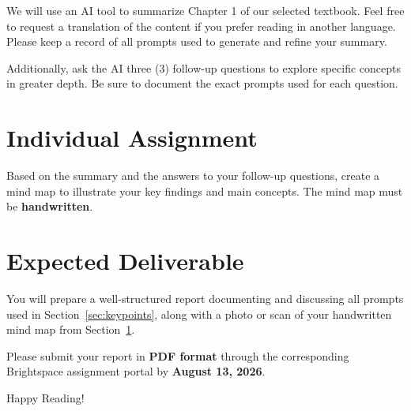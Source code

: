 \documentclass{article}
\begin{document}
We will use an AI tool to summarize Chapter 1 of our selected textbook. Feel free to request a translation of the content if you prefer reading in another language. Please keep a record of all prompts used to generate and refine your summary.

Additionally, ask the AI three (3) follow-up questions to explore specific concepts in greater depth. Be sure to document the exact prompts used for each question.

\section{Individual Assignment}
\label{sec:work}

Based on the summary and the answers to your follow-up questions, create a mind map to illustrate your key findings and main concepts. The mind map must be \textbf{handwritten}.

\section{Expected Deliverable}
\label{sec:deliverables}

You will prepare a well-structured report documenting and discussing all prompts used in Section~\ref{sec:keypoints}, along with a photo or scan of your handwritten mind map from Section~\ref{sec:work}.

Please submit your report in \textbf{PDF format} through the corresponding Brightspace\texttrademark{} assignment portal by \textbf{August 13, 2026}.

\vspace{5mm}
Happy Reading! %
\end{document}
